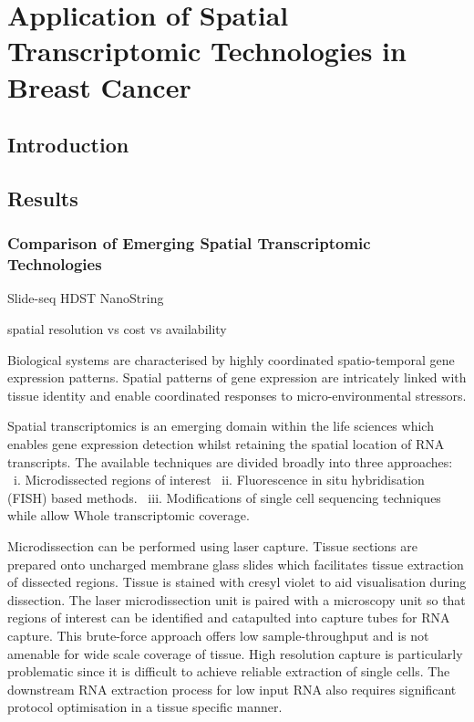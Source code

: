 \chapter{\label{ch:3}Application of Spatial Transcriptomic Technologies in Breast Cancer}

\minitoc

\section{Introduction}


\section{Results}


\subsection{Comparison of Emerging Spatial Transcriptomic Technologies}
Slide-seq
HDST
NanoString

spatial resolution vs cost vs availability

Biological systems are characterised by highly coordinated spatio-temporal gene expression patterns. Spatial patterns of gene expression are intricately linked with tissue identity and enable coordinated responses to micro-environmental stressors.

Spatial transcriptomics is an emerging domain within the life sciences which enables gene expression detection whilst retaining the spatial location of RNA transcripts. The available techniques are divided broadly into three approaches: 										\
i. Microdissected regions of interest														\
ii. Fluorescence in situ hybridisation (FISH) based methods. 								\
iii. Modifications of single cell sequencing techniques while allow Whole transcriptomic coverage. 																					\									

Microdissection can be performed using laser capture. Tissue sections are prepared onto uncharged membrane glass slides which facilitates tissue extraction of dissected regions. Tissue is stained with cresyl violet to aid visualisation during dissection. The laser microdissection unit is paired with a microscopy unit so that regions of interest can be identified and catapulted into capture tubes for RNA capture. This brute-force approach offers low sample-throughput and is not amenable for wide scale coverage of tissue. High resolution capture is particularly problematic since it is difficult to achieve reliable extraction of single cells. The downstream RNA extraction process for low input RNA also requires significant protocol optimisation in a tissue specific manner.

